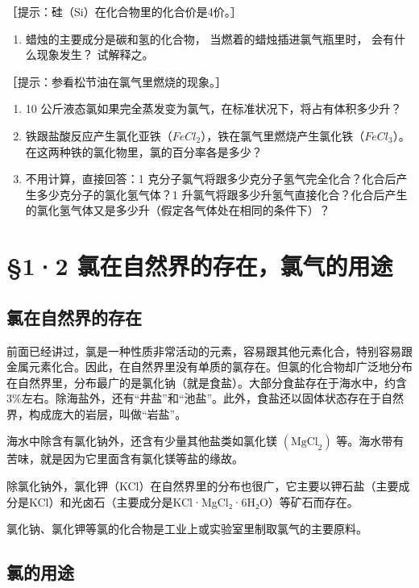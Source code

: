 ［提示：硅（Si）在化合物里的化合价是4价。］

\begin{enumerate}[start=7]
\item
  蜡烛的主要成分是碳和氢的化合物， 当燃着的蜡烛插进氯气瓶里时，
  会有什么现象发生？ 试解释之。
\end{enumerate}

［提示：参看松节油在氯气里燃烧的现象。］

\begin{enumerate}[start=8]
\item
  10 公斤液态氯如果完全蒸发变为氯气，在标准状况下，将占有体积多少升？
\item
  铁跟盐酸反应产生氯化亚铁（\(FeCl_{2}\)），铁在氯气里燃烧产生氯化铁（\(FeCl_{3}\)）。在这两种铁的氯化物里，氯的百分率各是多少？
\item
  不用计算，直接回答：1
  克分子氯气将跟多少克分子氢气完全化合？化合后产生多少克分子的氯化氢气体？1
  升氯气将跟多少升氢气直接化合？化合后产生的氯化氢气体又是多少升（假定各气体处在相同的条件下）？
\end{enumerate}

\section{§1·2 氯在自然界的存在，氯气的用途}

\subsection{氯在自然界的存在}

前面已经讲过，氯是一种性质非常活动的元素，容易跟其他元素化合，特别容易跟金属元素化合。因此，在自然界里没有单质的氯存在。但氯的化合物却广泛地分布在自然界里，分布最广的是氯化钠（就是食盐）。大部分食盐存在于海水中，约含3\%左右。除海盐外，还有``井盐''和``池盐''。此外，食盐还以固体状态存在于自然界，构成庞大的岩层，叫做``岩盐''。

海水中除含有氯化钠外，还含有少量其他盐类如氯化镁
\(\left(\mathrm{MgCl}_{2}\right)\)
等。海水带有苦味，就是因为它里面含有氯化镁等盐的缘故。

除氯化钠外，氯化钾（KCl）在自然界里的分布也很广，它主要以钾石盐（主要成分是KCl）和光卤石（主要成分是KCl·MgCl₂·6H₂O）等矿石而存在。

氯化钠、氯化钾等氯的化合物是工业上或实验室里制取氯气的主要原料。

\subsection{氯的用途}

